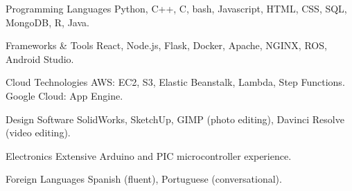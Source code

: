 
\begin{cvskills}
  \cvskill
    {Programming Languages} %
    {Python, C++, C, bash, Javascript, HTML, CSS, SQL, MongoDB, R, Java.} %

  \cvskill
    {Frameworks \& Tools} %
    {React, Node.js, Flask, Docker, Apache, NGINX, ROS, Android Studio.} %

  \cvskill
    {Cloud Technologies} %
    {AWS: EC2, S3, Elastic Beanstalk, Lambda, Step Functions. Google Cloud: App Engine.} %

  \cvskill
    {Design Software}
    {SolidWorks, SketchUp, GIMP (photo editing), Davinci Resolve (video editing).}

  \cvskill
    {Electronics}
    {Extensive Arduino and PIC microcontroller experience.}

  \cvskill
    {Foreign Languages}
    {Spanish (fluent), Portuguese (conversational).}

\end{cvskills}
